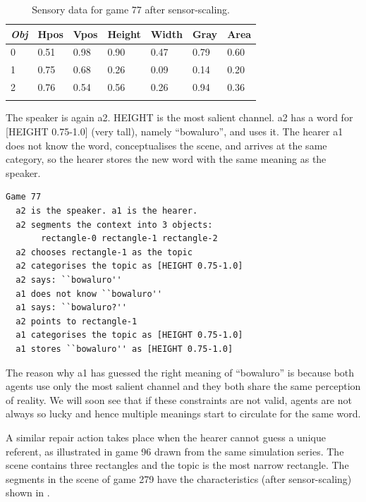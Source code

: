 \begin{table}
\begin{center}
\begin{tabular}{ l  l  l  l  l  l  l }
\lsptoprule
{\itshape Obj} & Hpos & Vpos & Height & Width & Gray & Area \\ \midrule
0 & 0.51 & 0.98 & 0.90 & 0.47 & 0.79 & 0.60\\ 
1 & 0.75 & 0.68 & 0.26 & 0.09 & 0.14 & 0.20\\ 
2 & 0.76 & 0.54 & 0.56 & 0.26 & 0.94 & 0.36\\ 
\lspbottomrule
\end{tabular}
\caption{\label{tab:game77} Sensory data for game 77 after sensor-scaling.}
\end{center}
\end{table}
The speaker is again {\bfshape  a2}. HEIGHT is the most salient channel. 
{\bfshape  a2} has a word for [HEIGHT 0.75-1.0] (very tall), namely
``bowaluro'', and uses it. The hearer {\bfshape  a1} 
does not know the 
word, conceptualises the scene, and arrives at the 
same category, so the hearer stores the new word
with the same meaning as the speaker. 
\begin{verbatim}
Game 77
  a2 is the speaker. a1 is the hearer. 
  a2 segments the context into 3 objects: 
       rectangle-0 rectangle-1 rectangle-2
  a2 chooses rectangle-1 as the topic 
  a2 categorises the topic as [HEIGHT 0.75-1.0]
  a2 says: ``bowaluro''
  a1 does not know ``bowaluro''
  a1 says: ``bowaluro?''
  a2 points to rectangle-1
  a1 categorises the topic as [HEIGHT 0.75-1.0]
  a1 stores ``bowaluro'' as [HEIGHT 0.75-1.0]
\end{verbatim}
The reason why {\bfshape  a1} has guessed the right 
meaning of ``bowaluro'' is because both agents use
only the most salient channel and they both share
the same perception of reality. We will soon see 
that if these constraints are not valid, agents 
are not always so lucky and hence multiple meanings
start to circulate for the same word. 

A similar repair action takes place when the hearer
cannot guess a unique referent, as illustrated in
game 96 drawn from the same simulation series. 
The scene contains three rectangles and the 
topic is the most narrow rectangle. The segments in the scene of game 279
have the characteristics (after sensor-scaling) shown in . 


